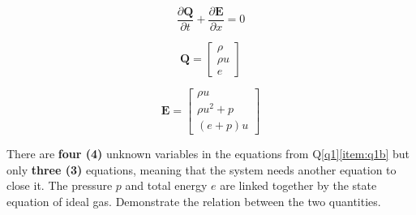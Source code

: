 	\begin{equation}
	\frac{\partial \textbf{Q} }{\partial t} + \frac{\partial \textbf{E}}{\partial x} = 0 \nonumber
	\end{equation}
	
	\begin{equation}
	\textbf{Q} = \begin{bmatrix}
	\rho \\ \rho u \\ e
	\end{bmatrix}    \nonumber
\end{equation}

\begin{equation}	
	\textbf{E} = \begin{bmatrix}
\rho u \\ \rho u^2 + p \\ (e+p)u
\end{bmatrix}	\nonumber
	\end{equation}
		
		

\item There are \textbf{four (4)} unknown variables in the equations from Q\ref{q1}\ref{item:q1b} but only \textbf{three (3)} equations, meaning that the system needs another equation to close it. The pressure $p$ and total energy $e$ are linked together by the state equation of ideal gas. Demonstrate the relation between the two quantities.

		
\listclose %

